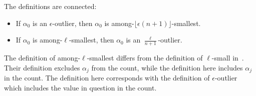 \documentclass[12pt]{article}
\begin{document}
\begin{remark}
    The definitions are connected:
    \begin{itemize}
        \item
            If \( \alpha_0 \) is an \( \epsilon \)-outlier, then \(
            \alpha_0 \) is among-\( \lfloor \epsilon (n+1) \rfloor \)-smallest.
        \item
            If \( \alpha_0 \) is among-\( \ell \)-smallest, then \(
            \alpha_0 \) is an \( \frac{\ell}{n+1} \)-outlier.
    \end{itemize}
\end{remark}

\begin{remark}
  The definition of among-\( \ell \)-smallest differs from the
  definition of \(\ell\)-small in~\cite{Chikina2860}.  Their
  definition excludes \( \alpha_j \) from the count, while the
  definition here includes \( \alpha_j \) in the count.  The
  definition here corresponds with the definition of \( \epsilon
  \)-outlier which includes the value in question in the count.
\end{remark}
\end{document}
